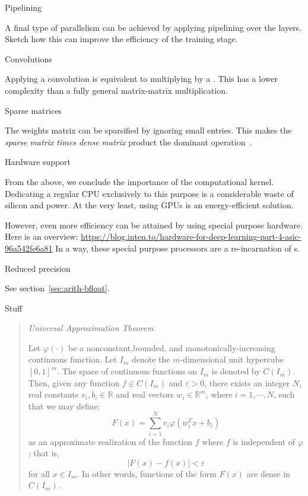  {Pipelining}

A final type of parallelism can be achieved by applying pipelining over the layers.
Sketch how this can improve the efficiency of the training stage.

 {Convolutions}

Applying a convolution is equivalent to multiplying by a .
This has a lower complexity than a fully general matrix-matrix multiplication.


 {Sparse matrices}

The weights matrix can be sparsified by ignoring small entries.
This makes the
\emph{sparse matrix times dense matrix}
product the dominant operation~\cite{Gale:SparseDL-sc20}.

 {Hardware support}

From the above, we conclude the importance of the 
computational kernel.
Dedicating a regular CPU exclusively to this purpose
is a considerable waste of silicon and power.
At the very least, using \acp{GPU} is an energy-efficient solution.

However, even more efficiency can be attained by using special purpose hardware.
Here is an overview:
\url{https://blog.inten.to/hardware-for-deep-learning-part-4-asic-96a542fe6a81}
In a way, these special purpose processors are a re-incarnation of
s.

 {Reduced precision}
\label{sec:dl-bfloat}

See section~\ref{sec:arith-bfloat}.

 {Stuff}

\begin{quotation}
  \textsl{Universal Approximation Theorem}%

  Let $\varphi(\cdot)$ be a nonconstant,bounded, and
  monotonically-increasing continuous function. Let $I_m$ denote the
  $m$-dimensional unit hypercube $[0,1]^m$. The space
  of continuous functions on $I_m$ is denoted by
  $C(I_m)$. Then, given any function $f\in C(I_m)$
  and $\varepsilon>0$, there exists an integer
  $N$, real constants $v_i,b_i\in\mathbb{R}$ and
  real vectors $w_i \in \mathbb{R}^m$, where
  $i=1,\cdots,N$, such that we may define:
  \[
  F( x ) =
  \sum_{i=1}^{N} v_i \varphi \left( w_i^T x + b_i\right)
  \]
  as an approximate realization of the function $f$ where
  $f$ is independent of $\varphi$; that is,
  \[
  | F( x ) - f ( x ) | < \varepsilon
  \]
  for all $x\in I_m$. In other words, functions of the form
  $F(x)$ are dense in $C(I_m)$.
\end{quotation}

